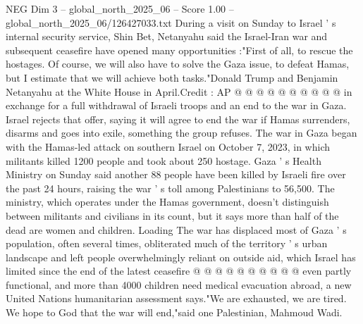 \begin{textsample}{NEG Dim 3 – global\_north\_2025\_06 – Score 1.00 – global\_north\_2025\_06/126427033.txt}
During a visit on Sunday to Israel ' s internal security service, Shin Bet, Netanyahu said the Israel-Iran war and subsequent ceasefire have opened many opportunities :"First of all, to rescue the hostages.
Of course, we will also have to solve the Gaza issue, to defeat Hamas, but I estimate that we will achieve both tasks."Donald Trump and Benjamin Netanyahu at the White House in April.Credit : AP @ @ @ @ @ @ @ @ @ @ in exchange for a full withdrawal of Israeli troops and an end to the war in Gaza.
Israel rejects that offer, saying it will agree to end the war if Hamas surrenders, disarms and goes into exile, something the group refuses.
The war in Gaza began with the Hamas-led attack on southern Israel on October 7, 2023, in which militants killed 1200 people and took about 250 hostage.
Gaza ' s Health Ministry on Sunday said another 88 people have been killed by Israeli fire over the past 24 hours, raising the war ' s toll among Palestinians to 56,500.
The ministry, which operates under the Hamas government, doesn't distinguish between militants and civilians in its count, but it says more than half of the dead are women and children.
Loading The war has displaced most of Gaza ' s population, often several times, obliterated much of the territory ' s urban landscape and left people overwhelmingly reliant on outside aid, which Israel has limited since the end of the latest ceasefire @ @ @ @ @ @ @ @ @ @ even partly functional, and more than 4000 children need medical evacuation abroad, a new United Nations humanitarian assessment says."We are exhausted, we are tired.
We hope to God that the war will end,"said one Palestinian, Mahmoud Wadi.

\end{textsample}
